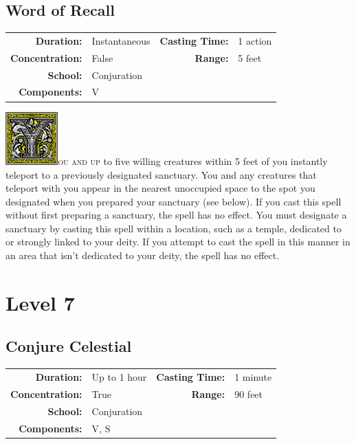 \documentclass[12pt,showtrims]{memoir}
\begin{document}
\newpage
\section*{Word of Recall}

{
\small\centering\vspace{-6pt}
\begin{tabular}{rlrl}
\toprule

\textbf{Duration:} & Instantaneous &
\textbf{Casting Time:} & 1 action \\
\textbf{Concentration:} & False &
\textbf{Range:} & 5 feet \\
\textbf{School:} & Conjuration \\
\textbf{Components:} & \multicolumn{3}{p{0.7\textwidth}}{V}\\

\bottomrule
\end{tabular}
}

\vspace{1\baselineskip}\noindent
\lettrine[lines=4]{\includegraphics[height=58pt]{initials/Y.png}}{ou and up} to five willing creatures within 5 feet of you instantly teleport to a previously designated sanctuary. You and any creatures that teleport with you appear in the nearest unoccupied space to the spot you designated when you prepared your sanctuary (see below). If you cast this spell without first preparing a sanctuary, the spell has no effect. You must designate a sanctuary by casting this spell within a location, such as a temple, dedicated to or strongly linked to your deity. If you attempt to cast the spell in this manner in an area that isn't dedicated to your deity, the spell has no effect.

\newpage
\chapter*{Level 7} 
\section*{Conjure Celestial}

{
\small\centering\vspace{-6pt}
\begin{tabular}{rlrl}
\toprule

\textbf{Duration:} & Up to 1 hour &
\textbf{Casting Time:} & 1 minute \\
\textbf{Concentration:} & True &
\textbf{Range:} & 90 feet \\
\textbf{School:} & Conjuration \\
\textbf{Components:} & \multicolumn{3}{p{0.7\textwidth}}{V, S}\\

\bottomrule
\end{tabular}
}
\end{document}
